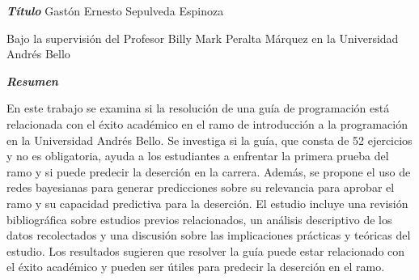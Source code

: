 \begin{center}
    \textbf{\LARGE \textit{Título}}
    \vfill
    Gastón Ernesto Sepulveda Espinoza

    Bajo la supervisión del Profesor Billy Mark Peralta Márquez en la Universidad Andrés Bello

\end{center}
\vfill
\begin{center}
    \textbf{\LARGE \textit{Resumen}}
\end{center}

En este trabajo se examina si la resolución de una guía de programación 
está relacionada con el éxito académico en el ramo de introducción a la 
programación en la Universidad Andrés Bello. Se investiga si la guía, que 
consta de 52 ejercicios y no es obligatoria, ayuda a los estudiantes 
a enfrentar la primera prueba del ramo y si puede predecir la deserción 
en la carrera. 
Además, se propone el uso de redes bayesianas para generar predicciones 
sobre su relevancia para aprobar el ramo y su capacidad predictiva para 
la deserción. El estudio incluye una revisión bibliográfica sobre estudios 
previos relacionados, un análisis descriptivo de los datos recolectados y 
una discusión sobre las implicaciones prácticas y teóricas del estudio. 
Los resultados sugieren que resolver la guía puede estar relacionado con 
el éxito académico y pueden ser útiles para predecir la deserción en el ramo.
\vfill